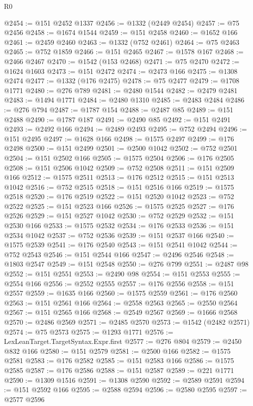 \begin{lexlean}{R0}
\begin{coremodule}
@2454 := @151 @2452 @1337
@2456 := @1332 (@2449 @2454)
@2457 := @75 @2456
@2458 := @1674 @1544
@2459 := @151 @2458
@2460 := @1652 @166
@2461 := @2459 @2460
@2463 := @1332 (@752 @2461)
@2464 := @75 @2463
@2465 := @752 @1859
@2466 := @151 @2465
@2467 := @1578 @167
@2468 := @2466 @2467
@2470 := @1542 (@153 @2468)
@2471 := @75 @2470
@2472 := @1624 @1603
@2473 := @151 @2472
@2474 := @2473 @166
@2475 := @1308 @2474
@2477 := @1332 (@176 @2475)
@2478 := @75 @2477
@2479 := @1708 @1771
@2480 := @276 @789
@2481 := @2480 @1544
@2482 := @2479 @2481
@2483 := @1494 @1771
@2484 := @2480 @1310
@2485 := @2483 @2484
@2486 := @276 @794
@2487 := @1787 @154
@2488 := @2487 @85
@2489 := @151 @2488
@2490 := @1787 @187
@2491 := @2490 @85
@2492 := @151 @2491
@2493 := @2492 @166
@2494 := @2489 @2493
@2495 := @752 @2494
@2496 := @151 @2495
@2497 := @1628 @166
@2498 := @1575 @2497
@2499 := @176 @2498
@2500 := @151 @2499
@2501 := @2500 @1042
@2502 := @752 @2501
@2504 := @151 @2502 @166
@2505 := @1575 @2504
@2506 := @176 @2505
@2508 := @151 @2506 @1042
@2509 := @752 @2508
@2511 := @151 @2509 @166
@2512 := @1575 @2511
@2513 := @176 @2512
@2515 := @151 @2513 @1042
@2516 := @752 @2515
@2518 := @151 @2516 @166
@2519 := @1575 @2518
@2520 := @176 @2519
@2522 := @151 @2520 @1042
@2523 := @752 @2522
@2525 := @151 @2523 @166
@2526 := @1575 @2525
@2527 := @176 @2526
@2529 := @151 @2527 @1042
@2530 := @752 @2529
@2532 := @151 @2530 @166
@2533 := @1575 @2532
@2534 := @176 @2533
@2536 := @151 @2534 @1042
@2537 := @752 @2536
@2539 := @151 @2537 @166
@2540 := @1575 @2539
@2541 := @176 @2540
@2543 := @151 @2541 @1042
@2544 := @752 @2543
@2546 := @151 @2544 @166
@2547 := @2496 @2546
@2548 := @1803 @2547
@2549 := @151 @2548
@2550 := @276 @799
@2551 := @2487 @98
@2552 := @151 @2551
@2553 := @2490 @98
@2554 := @151 @2553
@2555 := @2554 @166
@2556 := @2552 @2555
@2557 := @176 @2556
@2558 := @151 @2557
@2559 := @1635 @166
@2560 := @1575 @2559
@2561 := @176 @2560
@2563 := @151 @2561 @166
@2564 := @2558 @2563
@2565 := @2550 @2564
@2567 := @151 @2565 @166
@2568 := @2549 @2567
@2569 := @1666 @2568
@2570 := @2486 @2569
@2571 := @2485 @2570
@2573 := @1542 (@2482 @2571)
@2574 := @75 @2573
@2575 := @1293 @1771
@2576 := LexLeanTarget.TargetSyntax.Expr.first
@2577 := @276 @804
@2579 := @2450 @832 @166
@2580 := @151 @2579
@2581 := @2500 @166
@2582 := @1575 @2581
@2583 := @176 @2582
@2585 := @151 @2583 @166
@2586 := @1575 @2585
@2587 := @176 @2586
@2588 := @151 @2587
@2589 := @221 @1771
@2590 := @1309 @1516
@2591 := @1308 @2590
@2592 := @2589 @2591
@2594 := @151 @2592 @166
@2595 := @2588 @2594
@2596 := @2580 @2595
@2597 := @2577 @2596

\end{coremodule}
\end{lexlean}
